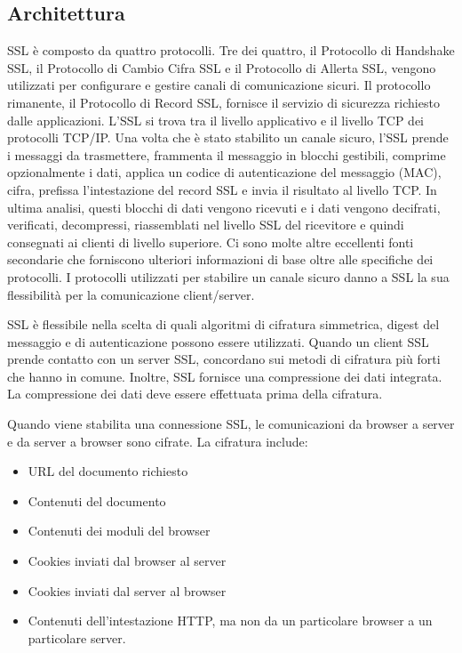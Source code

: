 \documentclass{article}
\theoremstyle{definition}
\begin{document}
\subsection{Architettura}
SSL è composto da quattro protocolli. Tre dei quattro, il Protocollo di Handshake SSL, il Protocollo di Cambio Cifra SSL e il Protocollo di Allerta SSL, vengono utilizzati per configurare e gestire canali di comunicazione sicuri. Il protocollo rimanente, il Protocollo di Record SSL, fornisce il servizio di sicurezza richiesto dalle applicazioni. L'SSL si trova tra il livello applicativo e il livello TCP dei protocolli TCP/IP. Una volta che è stato stabilito un canale sicuro, l'SSL prende i messaggi da trasmettere, frammenta il messaggio in blocchi gestibili, comprime opzionalmente i dati, applica un codice di autenticazione del messaggio (MAC), cifra, prefissa l'intestazione del record SSL e invia il risultato al livello TCP. In ultima analisi, questi blocchi di dati vengono ricevuti e i dati vengono decifrati, verificati, decompressi, riassemblati nel livello SSL del ricevitore e quindi consegnati ai clienti di livello superiore.
Ci sono molte altre eccellenti fonti secondarie che forniscono ulteriori informazioni di base oltre alle specifiche dei protocolli. I protocolli utilizzati per stabilire un canale sicuro danno a SSL la sua flessibilità per la comunicazione client/server.

SSL è flessibile nella scelta di quali algoritmi di cifratura simmetrica, digest del messaggio e di autenticazione possono essere utilizzati. Quando un client SSL prende contatto con un server SSL, concordano sui metodi di cifratura più forti che hanno in comune. Inoltre, SSL fornisce una compressione dei dati integrata. La compressione dei dati deve essere effettuata prima della cifratura.

Quando viene stabilita una connessione SSL, le comunicazioni da browser a server e da server a browser sono cifrate. La cifratura include:
\begin{itemize}
    \item URL del documento richiesto
    \item Contenuti del documento
    \item Contenuti dei moduli del browser
    \item Cookies inviati dal browser al server
    \item Cookies inviati dal server al browser
    \item Contenuti dell'intestazione HTTP, ma non da un particolare browser a un particolare server.
\end{itemize}
\end{document}
